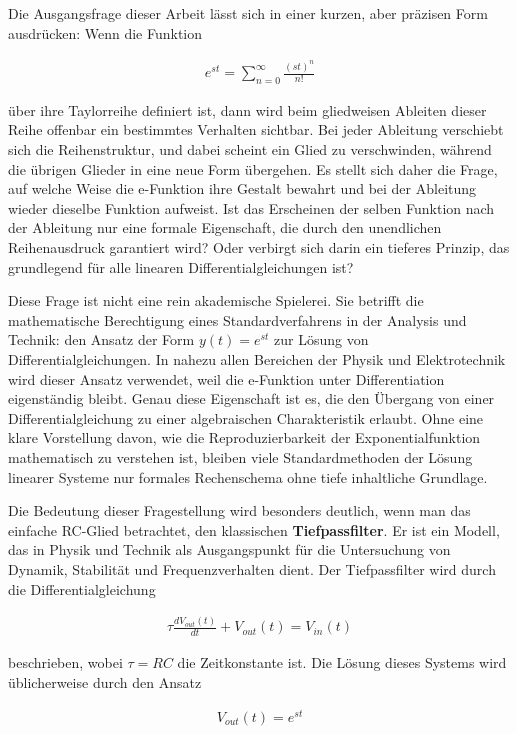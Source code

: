 \documentclass[a4paper,12pt,twoside]{report}
\theoremstyle{definition}
\begin{document}
Die Ausgangsfrage dieser Arbeit lässt sich in einer kurzen, aber präzisen Form ausdrücken: Wenn die Funktion

\begin{align}
    e^{st} = \sum_{n=0}^{\infty} \frac{(st)^n}{n!}
\end{align}

über ihre Taylorreihe definiert ist, dann wird beim gliedweisen Ableiten dieser Reihe offenbar ein bestimmtes Verhalten sichtbar. Bei jeder Ableitung verschiebt sich die Reihenstruktur, und dabei scheint ein Glied zu verschwinden, während die übrigen Glieder in eine neue Form übergehen. Es stellt sich daher die Frage, auf welche Weise die e-Funktion ihre Gestalt bewahrt und bei der Ableitung wieder dieselbe Funktion aufweist. Ist das Erscheinen der selben Funktion nach der Ableitung nur eine formale Eigenschaft, die durch den unendlichen Reihenausdruck garantiert wird? Oder verbirgt sich darin ein tieferes Prinzip, das grundlegend für alle linearen Differentialgleichungen ist?

Diese Frage ist nicht eine rein akademische Spielerei. Sie betrifft die mathematische Berechtigung eines Standardverfahrens in der Analysis und Technik: den Ansatz der Form $y(t) = e^{st}$ zur Lösung von Differentialgleichungen. In nahezu allen Bereichen der Physik und Elektrotechnik wird dieser Ansatz verwendet, weil die e-Funktion unter Differentiation eigenständig bleibt. Genau diese Eigenschaft ist es, die den Übergang von einer Differentialgleichung zu einer algebraischen Charakteristik erlaubt. Ohne eine klare Vorstellung davon, wie die Reproduzierbarkeit der Exponentialfunktion mathematisch zu verstehen ist, bleiben viele Standardmethoden der Lösung linearer Systeme nur formales Rechenschema ohne tiefe inhaltliche Grundlage.

Die Bedeutung dieser Fragestellung wird besonders deutlich, wenn man das einfache RC-Glied betrachtet, den klassischen \textbf{Tiefpassfilter}. Er ist ein Modell, das in Physik und Technik als Ausgangspunkt für die Untersuchung von Dynamik, Stabilität und Frequenzverhalten dient. Der Tiefpassfilter wird durch die Differentialgleichung

\begin{align}
    \tau \frac{dV_{out}(t)}{dt} + V_{out}(t) = V_{in}(t)
\end{align}

beschrieben, wobei $\tau = RC$ die Zeitkonstante ist. Die Lösung dieses Systems wird üblicherweise durch den Ansatz

\begin{align}
    V_{out}(t) = e^{st}
\end{align}
\end{document}
